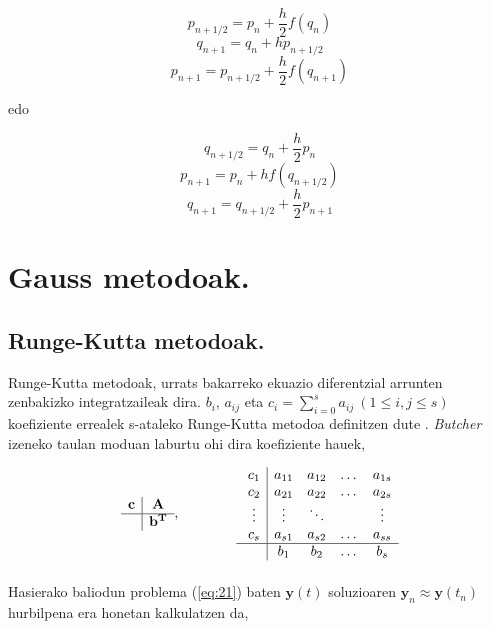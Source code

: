 \[p_{{n+1}/{2}}=p_n+\frac{h}{2} f(q_n)\]
\begin{equation}
q_{n+1}=q_n+h p_{{n+1}/{2}}
\end{equation}
\[p_{n+1}=p_{{n+1}/{2}}+\frac{h}{2}f(q_{n+1})\]

edo

\[q_{{n+1}/{2}}=q_n+\frac{h}{2} p_n\]
\begin{equation}
p_{n+1}=p_n+h f(q_{{n+1}/{2}})
\end{equation}
\[q_{n+1}=q_{{n+1}/{2}}+\frac{h}{2} p_{n+1}\]

\section{Gauss metodoak.}

\subsection{Runge-Kutta metodoak.}

Runge-Kutta metodoak, urrats bakarreko ekuazio diferentzial arrunten zenbakizko integratzaileak dira.  $b_{i}$, $a_{ij}$ eta $c_i=\sum\limits_{i=0}^{s} a_{ij} \ (1 \leq i,j \leq s)$ koefiziente errealek s-ataleko Runge-Kutta metodoa definitzen dute . \emph{Butcher} izeneko taulan moduan laburtu ohi dira koefiziente hauek, 

\begin{equation}
\begin{array}{c|c}
  \bf{c} & \bf{A} \\
  \hline
         &  \bf{b}^T\\
\end{array}, \ \ \ \ \ \ \ \ \ \ \ \
\begin{array}{c|cccc}
  \ c_1 &  a_{11} & a_{12} & \dots & a_{1s}\\
  \ c_2 &  a_{21} & a_{22} & \dots &a_{2s}\\
  \ \vdots & \vdots & \ddots & & \vdots \\
  \ c_s & a_{s1} & a_{s2} & \dots & a_{ss}\\
  \hline
  \  & b_{1} & b_{2} & \dots & b_{s}\\
\end{array}
\end{equation}

\paragraph*{} Hasierako baliodun problema (\ref{eq:21}) baten $\mathbf{y}(t)$ soluzioaren $\mathbf{y}_n \approx \mathbf{y}(t_n)$ hurbilpena era honetan kalkulatzen da,

